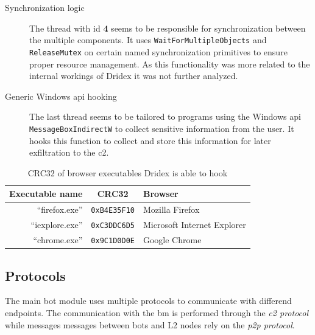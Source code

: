 \begin{description}
    \item[Synchronization logic] The thread with id \textbf{4} seems to be responsible for synchronization between the multiple components.
    It uses \lstinline|WaitForMultipleObjects| and \lstinline|ReleaseMutex| on certain named synchronization primitives to ensure proper resource management.
    As this functionality was more related to the internal workings of Dridex it was not further analyzed.
    \item[Generic Windows \gls{api} hooking] The last thread seems to be tailored to programs using the Windows \gls{api} \lstinline|MessageBoxIndirectW| to collect sensitive information from the user.
    It hooks this function to collect and store this information for later exfiltration to the \gls{c2}.
\end{description}

\begin{table}
    \centering
    \begin{tabular}{rcl}
        \toprule
        Executable name &
        CRC32 &
        Browser \\
        \midrule

        ``firefox.exe'' &
        \texttt{0xB4E35F10} &
        Mozilla Firefox \\

        ``iexplore.exe''  &
        \texttt{0xC3DDC6D5} &
        Microsoft Internet Explorer \\

        ``chrome.exe'' &
        \texttt{0x9C1D0D0E} &
        Google Chrome \\
        \bottomrule
    \end{tabular}
    \caption[CRC32 of browser executables]{CRC32 of browser executables Dridex is able to hook\label{tab:Main_module::BrowserCRC32}}
\end{table}

\subsection{Protocols\label{subsec:Reverse_engineering_Dridex::Bot_stage::Protocols}}
The main bot module uses multiple protocols to communicate with differend endpoints.
The communication with the \gls{bm} is performed through the \emph{\gls{c2} protocol} while messages messages between bots and L2 nodes rely on the \emph{\gls{p2p} protocol}.

